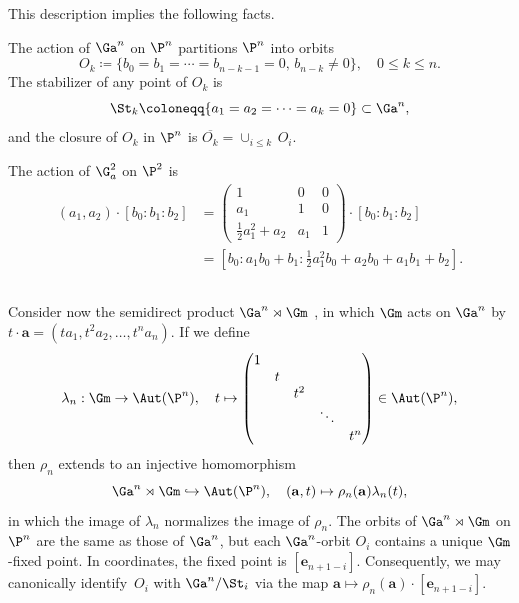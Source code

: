 This description implies the following facts.
\begin{prop}
  The action of $\Ga^n$ on $\P^n$ partitions $\P^n$ into orbits
  \[ O_k \coloneqq \{ b_0 = b_1 = \cdots = b_{n-k-1} = 0, \, b_{n-k} \neq 0 \}, \quad 0 \leq k \leq n. \]
  The stabilizer of any point of $O_k$ is
  \[ \St_k \coloneqq \{ a_1 = a_2 = \cdots = a_{k} = 0 \} \subset \Ga^n, \]
  and the closure of $O_k$ in $\P^n$ is $\overline{O_k} = \cup_{i \leq k} \,O_i$.
\end{prop}
\begin{exam}
  The action of $\G_a^2$ on $\P^2$ is 
  \begin{align*}
  (a_1, a_2) \cdot [b_0 : b_1 : b_2] &=
    \begin{pmatrix}
      1 & 0 & 0 \\
      a_1 & 1 & 0 \\
      \frac12 a_1^2 + a_2 & a_1 & 1
    \end{pmatrix}
    \cdot [b_0 : b_1 : b_2]\\
    &= \left[b_0 : a_1 b_0 + b_1 : \tfrac12 a_1^2 b_0 + a_2 b_0 + a_1 b_1 + b_2 \right].
   \end{align*}
\end{exam}

\subsection{}\label{rmk_Gm} Consider now the semidirect product  $\Ga^n \rtimes \Gm$ , in which $\Gm$ acts on $\Ga^n$ by $t \cdot \mathbf a = (t a_1, t^2 a_2, \ldots, t^n a_n)$.
    If we define
\[
 \lambda_n: \Gm \to \Aut(\P^n), \quad  t \mapsto \begin{pmatrix}
                                                1 &   & &&\\
                                                  & t &  &&\\
                                                  & & t^2 && \\
                                                  &&&\ddots & \\
                                                &&&& t^n
                                               \end{pmatrix} \in \Aut(\P^n),
\]
then $\rho_n$ extends to an injective homomorphism
\[ \Ga^n \rtimes \Gm \hookrightarrow \Aut(\P^n), \quad (\mathbf a,t) \mapsto \rho_n(\mathbf a) \lambda_n(t), \]
in which the image of $\lambda_n$ normalizes the image of $\rho_n$.
The orbits of $\Ga^n \rtimes \Gm$ on $\P^n$ are the same as those of $\Ga^n$, but each $\Ga^n$-orbit $O_i$ contains a unique $\Gm$-fixed point. In coordinates, the fixed point is $[\mathbf e_{n+1-i}]$. Consequently, we may canonically identify~$O_i$ with $\Ga^n / \St_i$ via the map $\mathbf a \mapsto \rho_n(\mathbf a) \cdot [\mathbf e_{n+1-i}]$.

